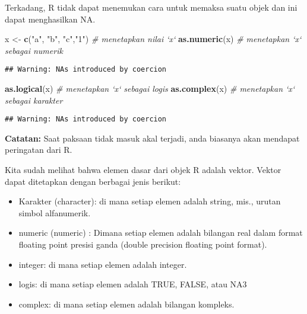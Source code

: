 \documentclass[
]{book}
\newenvironment{Shaded}{\begin{snugshade}}{\end{snugshade}}
\newcommand{\CommentTok}[1]{\textcolor[rgb]{0.56,0.35,0.01}{\textit{#1}}}
\newcommand{\KeywordTok}[1]{\textcolor[rgb]{0.13,0.29,0.53}{\textbf{#1}}}
\newcommand{\NormalTok}[1]{#1}
\newcommand{\StringTok}[1]{\textcolor[rgb]{0.31,0.60,0.02}{#1}}
\providecommand{\tightlist}{%
  \setlength{\itemsep}{0pt}\setlength{\parskip}{0pt}}
\begin{document}
Terkadang, R tidak dapat menemukan cara untuk memaksa suatu objek dan ini dapat menghasilkan NA.

\begin{Shaded}
\begin{Highlighting}[]
\NormalTok{x <-}\StringTok{ }\KeywordTok{c}\NormalTok{(}\StringTok{"a"}\NormalTok{, }\StringTok{"b"}\NormalTok{, }\StringTok{"c"}\NormalTok{,}\StringTok{"1"}\NormalTok{)       	         }\CommentTok{# menetapkan nilai `x`}
\KeywordTok{as.numeric}\NormalTok{(x)                          	   }\CommentTok{# menetapkan `x` sebagai numerik}
\end{Highlighting}
\end{Shaded}

\begin{verbatim}
## Warning: NAs introduced by coercion
\end{verbatim}

\begin{Shaded}
\begin{Highlighting}[]
\KeywordTok{as.logical}\NormalTok{(x)                        	     }\CommentTok{# menetapkan `x` sebagai logis}
\KeywordTok{as.complex}\NormalTok{(x)                        	     }\CommentTok{# menetapkan `x` sebagai karakter}
\end{Highlighting}
\end{Shaded}

\begin{verbatim}
## Warning: NAs introduced by coercion
\end{verbatim}

\textbf{Catatan:} Saat paksaan tidak masuk akal terjadi, anda biasanya akan mendapat peringatan dari R.

Kita sudah melihat bahwa elemen dasar dari objek R adalah vektor. Vektor dapat ditetapkan dengan berbagai jenis berikut:

\begin{itemize}
\tightlist
\item
  Karakter (character): di mana setiap elemen adalah string, mis., urutan simbol alfanumerik.
\item
  numeric (numeric) : Dimana setiap elemen adalah bilangan real dalam format floating point presisi ganda (double precision floating point format).
\item
  integer: di mana setiap elemen adalah integer.
\item
  logis: di mana setiap elemen adalah TRUE, FALSE, atau NA3
\item
  complex: di mana setiap elemen adalah bilangan kompleks.
\end{itemize}
\end{document}
